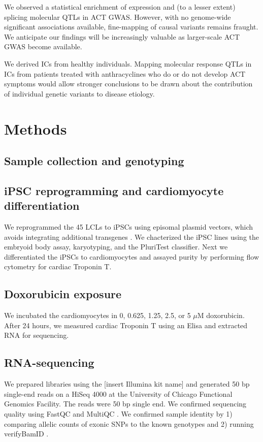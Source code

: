 \documentclass{article}
\begin{document}
{We observed a statistical enrichment of expression and (to a lesser extent) splicing molecular QTLs in ACT GWAS. However, with no genome-wide significant associations available, fine-mapping of causal variants remains fraught. We anticipate our findings will be increasingly valuable as larger-scale ACT GWAS become available. 

We derived ICs from healthy individuals. Mapping molecular response QTLs in ICs from patients treated with anthracyclines who do or do not develop ACT symptoms would allow stronger conclusions to be drawn about the contribution of individual genetic variants to disease etiology. 

\section*{Methods} 

\subsection*{Sample collection and genotyping}

\subsection*{iPSC reprogramming and cardiomyocyte differentiation} 

We reprogrammed the 45 LCLs to iPSCs using episomal plasmid vectors,
which avoids integrating additional transgenes \cite{Okita2011}. We
chacterized the iPSC lines using the embryoid body assay, karyotyping,
and the PluriTest \cite{Muller2011} classifier. Next we differentiated
the iPSCs to cardiomyocytes \cite{Lian2013, Burridge2014} and assayed
purity by performing flow cytometry for cardiac Troponin T.

\subsection*{Doxorubicin exposure}

We incubated the cardiomyocytes in 0, 0.625, 1.25, 2.5, or 5 $\mu$M
doxorubicin. After 24 hours, we measured cardiac Troponin T using an
Elisa and extracted RNA for sequencing.

\subsection*{RNA-sequencing}

We prepared libraries using the [insert Illumina kit name] and
generated 50 bp single-end reads on a HiSeq 4000 at the University of
Chicago Functional Genomics Facility. The reads were 50 bp single
end. We confirmed sequencing quality using FastQC and MultiQC
\cite{Ewels2016}.  We confirmed sample identity by 1) comparing
allelic counts of exonic SNPs to the known genotypes and 2) running
verifyBamID \cite{Jun2012}.

}
\end{document}
